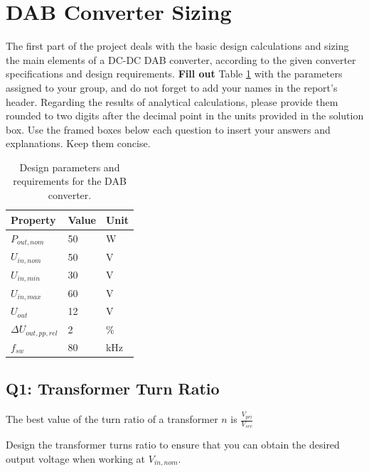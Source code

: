 \documentclass{PELsmallreport}
\begin{document}
\maketitle

\tableofcontents
\vfill

\clearpage
\section{DAB Converter Sizing}

The first part of the project deals with the basic design calculations and sizing the main elements of a DC-DC DAB converter, according to the given converter specifications and design requirements. \textbf{Fill out} Table \ref{Tab:Specs} with the parameters assigned to your group, and do not forget to add your names in the report's header. Regarding the results of analytical calculations, please provide them rounded to two digits after the decimal point in the units provided in the solution box. Use the framed boxes below each question to insert your answers and explanations. Keep them concise.

\begin{table}[H]
\caption{Design parameters and requirements for the DAB converter.}
\centering
\label{Tab:Specs}
\begin{tabular}{|l|l|l|}
  \hline
  \textbf{Property} & \textbf{Value} & \textbf{Unit} \\
  \hline
  $P_{out,nom}$ & 50 & \si{\watt} \\ \hline
  $U_{in,nom}$ & 50 & \si{\volt} \\ \hline
  $U_{in,min}$ & 30  & \si{\volt} \\ \hline
  $U_{in,max}$ & 60 & \si{\volt} \\ \hline  
  $U_{out}$ & 12 & \si{\volt} \\ \hline
  $\Delta U_{out,pp,rel}$ & 2 & \% \\ \hline
  $f_{sw}$ & 80 & \si{\kilo\hertz} \\ \hline
\end{tabular}
\end{table}

\subsection{Q1: Transformer Turn Ratio} 
    The best value of the turn ratio of a transformer $n$ is $\frac{V_{pri}}{V_{sec}}$
    
    Design the transformer turns ratio to ensure that you can obtain the desired output voltage when working at $V_{in, nom}$.
    
\end{document}
